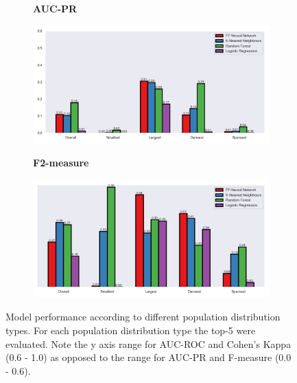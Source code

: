 \begin{figure}[hbt!]
\begin{subfigure}{.45\linewidth}
\vspace*{1ex}  
\begin{center}
\textbf{AUC-PR}
\end{center}
\vspace*{-1ex}
  \includegraphics[width=\linewidth]{Images/AUC_PR.png} %
\end{subfigure}
  \hspace*{-1em}
\begin{subfigure}{.45\linewidth}
\vspace*{1ex}  
\begin{center}
\textbf{F2-measure}
\end{center}
\vspace*{-1ex}
  \includegraphics[width=\linewidth]{Images/F2 totals.png} %
\end{subfigure}


\caption{Model performance according to different population distribution types. For each population distribution type the top-5 were evaluated. Note the y axis range for AUC-ROC and Cohen's Kappa (0.6 - 1.0) as opposed to the range for AUC-PR and F-measure  (0.0 - 0.6).}
\label{fig:analysis}
\end{figure}

